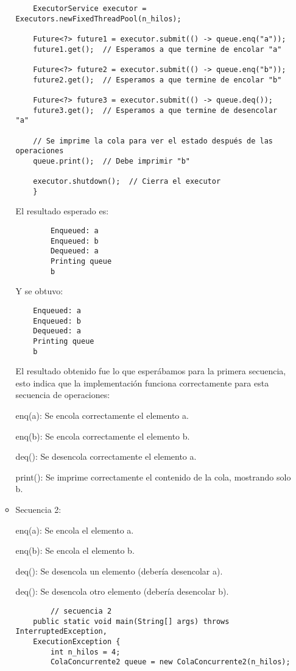 \begin{enumerate}
\begin{itemize}
\begin{verbatim}
    ExecutorService executor = Executors.newFixedThreadPool(n_hilos);
        
    Future<?> future1 = executor.submit(() -> queue.enq("a"));
    future1.get();  // Esperamos a que termine de encolar "a"
        
    Future<?> future2 = executor.submit(() -> queue.enq("b"));
    future2.get();  // Esperamos a que termine de encolar "b"
        
    Future<?> future3 = executor.submit(() -> queue.deq());
    future3.get();  // Esperamos a que termine de desencolar "a"
        
    // Se imprime la cola para ver el estado después de las operaciones
    queue.print();  // Debe imprimir "b"

    executor.shutdown();  // Cierra el executor
    }
    \end{verbatim}

    El resultado esperado es:
    \begin{verbatim}
        Enqueued: a
        Enqueued: b
        Dequeued: a
        Printing queue
        b
    \end{verbatim}

    Y se obtuvo:
    \begin{verbatim}
    Enqueued: a
    Enqueued: b
    Dequeued: a
    Printing queue
    b
    \end{verbatim}  

    El resultado obtenido fue lo que esperábamos para la primera secuencia, esto indica que la implementación funciona correctamente para esta secuencia de operaciones:

    enq(a): Se encola correctamente el elemento a.

    enq(b): Se encola correctamente el elemento b.

    deq(): Se desencola correctamente el elemento a.

    print(): Se imprime correctamente el contenido de la cola, mostrando solo b.

    \item Secuencia 2: 

    enq(a): Se encola el elemento a.

    enq(b): Se encola el elemento b.

    deq(): Se desencola un elemento (debería desencolar a).

    deq(): Se desencola otro elemento (debería desencolar b).

    \begin{verbatim}
        // secuencia 2
    public static void main(String[] args) throws InterruptedException, 
    ExecutionException {
        int n_hilos = 4;
        ColaConcurrente2 queue = new ColaConcurrente2(n_hilos);


\end{verbatim}
\end{itemize}
\end{enumerate}
